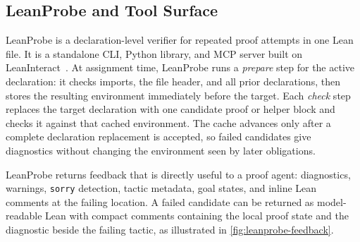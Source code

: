 \documentclass{article}
\newcommand{\lean}{Lean\xspace}
\begin{document}
\subsection{LeanProbe and Tool Surface}
\label{sec:leanprobe-tools}

LeanProbe is a declaration-level verifier for repeated proof attempts in one \lean file.
It is a standalone CLI, Python library, and MCP server built on LeanInteract~\citep{leaninteract2025}.
At assignment time, LeanProbe runs a \emph{prepare} step for the active declaration: it checks imports, the file header, and all prior declarations, then stores the resulting environment immediately before the target.
Each \emph{check} step replaces the target declaration with one candidate proof or helper block and checks it against that cached environment.
The cache advances only after a complete declaration replacement is accepted, so failed candidates give diagnostics without changing the environment seen by later obligations.

LeanProbe returns feedback that is directly useful to a proof agent: diagnostics, warnings, \texttt{sorry} detection, tactic metadata, goal states, and inline \lean comments at the failing location.
A failed candidate can be returned as model-readable \lean with compact comments containing the local proof state and the diagnostic beside the failing tactic, as illustrated in \cref{fig:leanprobe-feedback}.
\end{document}
